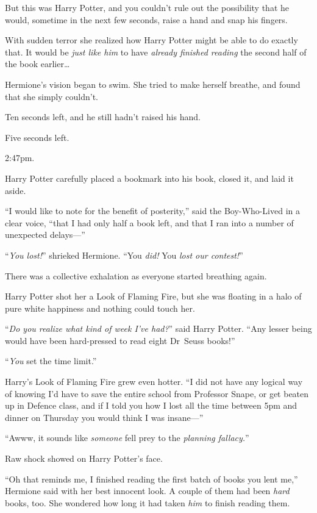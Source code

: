 But this was Harry Potter, and you couldn’t rule out the possibility that he would, sometime in the next few seconds, raise a hand and snap his fingers.

With sudden terror she realized how Harry Potter might be able to do exactly that. It would be \emph{just like him} to have \emph{already finished reading} the second half of the book earlier…

Hermione’s vision began to swim. She tried to make herself breathe, and found that she simply couldn’t.

Ten seconds left, and he still hadn’t raised his hand.

Five seconds left.

2:47pm.

Harry Potter carefully placed a bookmark into his book, closed it, and laid it aside.

“I would like to note for the benefit of posterity,” said the Boy-Who-Lived in a clear voice, “that I had only half a book left, and that I ran into a number of unexpected delays—”

“\emph{You lost!}” shrieked Hermione. “You \emph{did!} You \emph{lost our contest!}”

There was a collective exhalation as everyone started breathing again.

Harry Potter shot her a Look of Flaming Fire, but she was floating in a halo of pure white happiness and nothing could touch her.

“\emph{Do you realize what kind of week I’ve had?}” said Harry Potter. “Any lesser being would have been hard-pressed to read eight Dr~Seuss books!”

“\emph{You} set the time limit.”

Harry’s Look of Flaming Fire grew even hotter. “I did not have any logical way of knowing I’d have to save the entire school from Professor Snape, or get beaten up in Defence class, and if I told you how I lost all the time between 5pm and dinner on Thursday you would think I was insane—”

“Awww, it sounds like \emph{someone} fell prey to the \emph{planning fallacy.}”

Raw shock showed on Harry Potter’s face.

“Oh that reminds me, I finished reading the first batch of books you lent me,” Hermione said with her best innocent look. A couple of them had been \emph{hard} books, too. She wondered how long it had taken \emph{him} to finish reading them.

